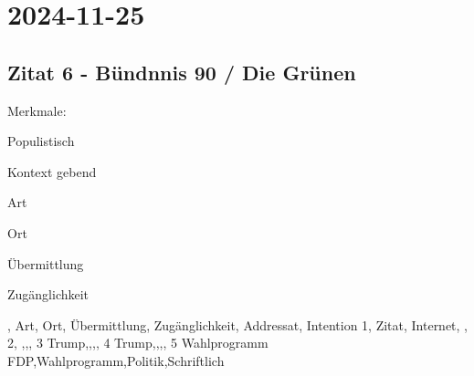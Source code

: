 \section{2024-11-25}

\subsection{Zitat 6 - Bündnnis 90 / Die Grünen}

Merkmale:
\startitemize[packed]
\item Populistisch
\item Kontext gebend
\item Art
\item Ort
\item Übermittlung
\item Zugänglichkeit
\stopitemize


\startframedtext[width=\dimexpr\textwidth+\rightmarginwidth+\rightmargindistance\relax,frame=off,offset=none] %
\startplacetable[location={here},title={}]
\setupTABLE[c][1][background=color,backgroundcolor=gray]
\setupTABLE[r][1][background=color,backgroundcolor=gray]
\bTABLE[option=stratch,offset=1mm]
\startCSV
[background=DiagonalRule] , Art, Ort, Übermittlung, Zugänglichkeit, Addressat, Intention
1, Zitat, Internet, ,
2, ,,,
3 Trump,,,,
4 Trump,,,,
5 Wahlprogramm FDP,Wahlprogramm,Politik,Schriftlich
\stopCSV
\eTABLE
\stopplacetable
\stopframedtext
